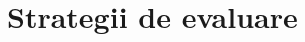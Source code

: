 \documentclass[xcolor=pdftex,romanian,colorlinks]{beamer}
\begin{document}
%
%

\section{Strategii de evaluare}
\end{document}
